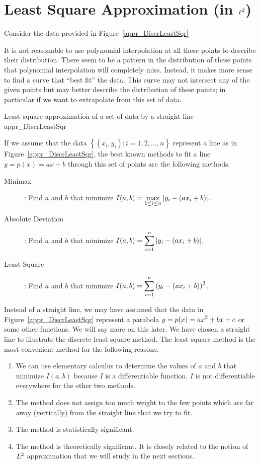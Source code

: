 \chapter{Least Square Approximation (in $\displaystyle \ell^2$)}
\label{ChaptApproxC}

Consider the data provided in Figure~\ref{appr_DiscrLeastSqr}

It is not reasonable to use polynomial interpolation at all these points to
describe their distribution.  There seem to be a pattern in the distribution
of these points that polynomial interpolation will completely miss.  Instead,
it makes more sense to find a curve that ``best fit'' the data.  This curve
may not intersect any of the given points but may better describe the
distribution of these points; in particular if we want to extrapolate from
this set of data.

{Least square approximation of a set of data by a straight line}
{appr_DiscrLeastSqr}

If we assume that the data $\left\{ (x_i,y_i) : i=1,2,\ldots, n\right\}$
represent a line as in Figure~\ref{appr_DiscrLeastSqr}, the best known
methods to fit a line $y=p(x)=ax+b$ through this set of points are the
following methods.
\begin{description}
\item[Minimax]: Find $a$ and $b$ that minimize
$\displaystyle I(a,b) = \max_{1\leq i \leq n} \left| y_i - (ax_i+b) \right|$.
\item[Absolute Deviation]: Find $a$ and $b$ that minimize
$\displaystyle I(a,b) = \sum_{i=1}^{n} \left| y_i - (ax_i+b)\right|$.
\item[Least Square]: Find $a$ and $b$ that minimize
$\displaystyle I(a,b) = \sum_{i=1}^{n} \left( y_i - (ax_i+b)\right)^2$.
\end{description}

Instead of a straight line, we may have assumed that the data in
Figure~\ref{appr_DiscrLeastSqr} represent a parabola
$\displaystyle y=p(x)= ax^2+bx+c$ or
some other functions.  We will say more on this later.  We have chosen a
straight line to illustrate the discrete least square method.  The least
square method is the most convenient method for the following reasons.
\begin{enumerate}
\item We can use elementary calculus to determine the values of $a$ and $b$
that minimize $I(a,b)$ because $I$ is a differentiable function.  $I$ is not
differentiable everywhere for the other two methods.
\item The method does not assign too much weight to the few points which are
far away (vertically) from the straight line that we try to fit.
\item The method is statistically significant.
\item The method is theoretically significant.  It is closely related to the
notion of $\displaystyle L^2$ approximation that we will study in the
next sections.
\end{enumerate}


